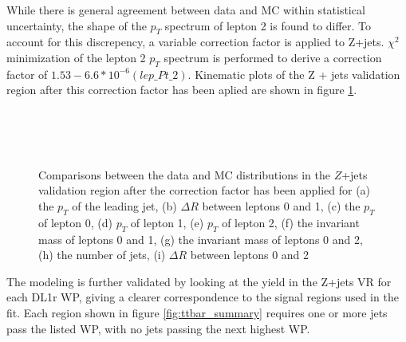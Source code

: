 While there is general agreement between data and MC within statistical uncertainty, the shape of the $p_T$ spectrum of lepton 2 is found to differ. To account for this discrepency, a variable correction factor is applied to Z+jets. $\chi^2$ minimization of the lepton 2 $p_T$ spectrum is performed to derive a correction factor of $1.53 - 6.6*10^{-6} (lep\_Pt\_2)$. Kinematic plots of the Z + jets validation region after this correction factor has been aplied are shown in figure \ref{fig:zjets_withScale}.

\begin{figure}[H]
    \\
    \\                                 
    \\
    \caption{Comparisons between the data and MC distributions in the $Z$+jets validation region after the correction factor has been applied for (a) the $p_T$ of the leading jet, (b) $\Delta R$ between leptons 0 and 1, (c) the $p_T$ of lepton 0, (d) $p_T$ of lepton 1, (e) $p_T$ of lepton 2, (f) the invariant mass of leptons 0 and 1, (g) the invariant mass of leptons 0 and 2, (h) the number of jets, (i) $\Delta R$ between leptons 0 and 2}%
    \label{fig:zjets_withScale}
\end{figure}

The modeling is further validated by looking at the yield in the Z+jets VR for each DL1r WP, giving a clearer correspondence to the signal regions used in the fit. Each region shown in figure \ref{fig:ttbar_summary} requires one or more jets pass the listed WP, with no jets passing the next highest WP.                                                                    

